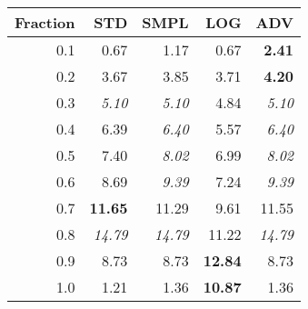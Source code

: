 \documentclass{standalone}
\begin{document}
\begin{tabular}{r|rrrr}
      \toprule
      Fraction & STD & SMPL & LOG & ADV\\
      \midrule
      0.1 & 0.67 & 1.17 & 0.67 & \textbf{2.41}\\
  0.2 & 3.67 & 3.85 & 3.71 & \textbf{4.20}\\
  0.3 & \emph{5.10} & \emph{5.10} & 4.84 & \emph{5.10}\\
  0.4 & 6.39 & \emph{6.40} & 5.57 & \emph{6.40}\\
  0.5 & 7.40 & \emph{8.02} & 6.99 & \emph{8.02}\\
  0.6 & 8.69 & \emph{9.39} & 7.24 & \emph{9.39}\\
  0.7 & \textbf{11.65} & 11.29 & 9.61 & 11.55\\
  0.8 & \emph{14.79} & \emph{14.79} & 11.22 & \emph{14.79}\\
  0.9 & 8.73 & 8.73 & \textbf{12.84} & 8.73\\
  1.0 & 1.21 & 1.36 & \textbf{10.87} & 1.36\\
  \bottomrule
\end{tabular}
\end{document}
